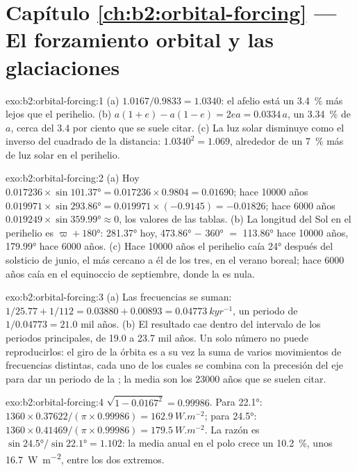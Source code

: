 \section*{Capítulo \ref{ch:b2:orbital-forcing} --- El forzamiento orbital y las glaciaciones}

\begin{solution}{exo:b2:orbital-forcing:1}
(a) $1.0167/0.9833 = 1.0340$: el afelio está un \qty{3.4}{\percent} más lejos que el perihelio.
(b) $a(1 + e) - a(1 - e) = 2ea = 0.0334\,a$, un \qty{3.34}{\percent} de $a$, cerca del 3.4 por ciento
que se suele citar. (c) La luz solar disminuye como el inverso del cuadrado de la distancia: $1.0340^2 = 1.069$,
alrededor de un \qty{7}{\percent} más de luz solar en el perihelio.
\end{solution}

\begin{solution}{exo:b2:orbital-forcing:2}
(a) Hoy $0.017236 \times \sin\ang{101.37} = 0.017236 \times 0.9804 = 0.01690$; hace \num{10000} años
$0.019971 \times \sin\ang{293.86} = 0.019971 \times (-0.9145) = -0.01826$; hace \num{6000} años
$0.019249 \times \sin\ang{359.99} \approx 0$, los valores de las tablas. (b) La longitud del Sol en el
perihelio es $\varpi + \ang{180}$: \ang{281.37} hoy, \ang{473.86} $-$ \ang{360} $=$ \ang{113.86}
hace \num{10000} años, \ang{179.99} hace \num{6000} años. (c) Hace \num{10000} años el perihelio
caía \ang{24} después del solsticio de junio, el más cercano a él de los tres, en el verano boreal;
hace \num{6000} años caía en el equinoccio de septiembre, donde la  es nula.
\end{solution}

\begin{solution}{exo:b2:orbital-forcing:3}
(a) Las frecuencias se suman: $1/25.77 + 1/112 = 0.03880 + 0.00893 = \qty{0.04773}{kyr^{-1}}$, un periodo
de $1/0.04773 = 21.0$ mil años. (b) El resultado cae dentro del intervalo de los periodos principales,
de 19.0 a 23.7 mil años. Un solo número no puede reproducirlos: el giro de la órbita
es a su vez la suma de varios movimientos de frecuencias distintas, cada uno de los cuales se combina con la
precesión del eje para dar un periodo de la ; la media son los
\num{23000} años que se suelen citar.
\end{solution}

\begin{solution}{exo:b2:orbital-forcing:4}
$\sqrt{1 - 0.0167^2} = 0.99986$. Para \ang{22.1}: $1360 \times 0.37622/(\pi \times 0.99986) =
\qty{162.9}{W.m^{-2}}$; para \ang{24.5}: $1360 \times 0.41469/(\pi \times 0.99986) =
\qty{179.5}{W.m^{-2}}$. La razón es $\sin\ang{24.5}/\sin\ang{22.1} = 1.102$: la media anual en el
polo crece un \qty{10.2}{\percent}, unos \qty{16.7}{W.m^{-2}}, entre los dos extremos.
\end{solution}


